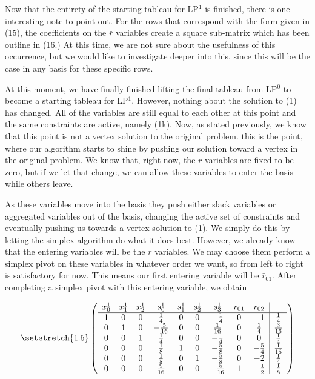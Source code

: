 \documentclass[11pt]{article} %
\begin{document}
	Now that the entirety of the starting tableau for LP$^1$ is finished, there is one interesting note to point out.  For the rows that correspond with the form given in (15), the coefficients on the $\bar{r}$ variables create a square sub-matrix which has been outline in (16.)  At this time, we are not sure about the usefulness of this occurrence, but we would like to investigate deeper into this, since this will be the case in any basis for these specific rows. 
	
	At this moment, we have finally finished lifting the final tableau from LP$^0$ to become a starting tableau for LP$^1$.  However, nothing about the solution to (1) has changed.  All of the variables are still equal to each other at this point and the same constraints are active, namely (1k).  Now, as stated previously, we know that this point is not a vertex solution to the original problem.  this is the point, where our algorithm starts to shine by pushing our solution toward a vertex in the original problem.  We know that, right now, the $\bar{r}$ variables are fixed to be zero, but if we let that change, we can allow these variables to enter the basis while others leave.
	
	As these variables move into the basis they push either slack variables or aggregated variables out of the basis, changing the active set of constraints and eventually pushing us towards a vertex solution to (1).  We simply do this by letting the simplex algorithm do what it does best.  However, we already know that the entering variables will be the $\bar{r}$ variables.  We may choose them perform a simplex pivot on these variables in whatever order we want, so from left to right is satisfactory for now.  This means our first entering variable will be $\bar{r}_{01}$.  After completing a simplex pivot with this entering variable, we obtain 
	
	\begin{equation}\setstretch{1.5}
	\begin{pmatrix}
	\begin{array}{ccccccccc|c}
	\bar{x}^1_0 & \bar{x}^1_1 & \bar{x}^1_2 & \bar{s}^1_0 & \bar{s}^1_1 & \bar{s}^1_2 & \bar{s}^1_3 & \bar{r}_{01} & \bar{r}_{02} \\
	\hline
	1 & 0 & 0 & \frac{1}{4} & 0 & 0 & -\frac{1}{4} & 0 & -1 & \frac{1}{4} \\ 
	0 & 1 & 0 & -\frac{5}{16} & 0 & 0 & \frac{1}{16} &  0 & \frac{1}{4} & \frac{3}{16} \\ 
	0 & 0 & 1 & \frac{1}{4} & 0 & 0 & -\frac{1}{4} & 0 & 0 & \frac{1}{4} \\ 
	0 & 0 & 0 & \frac{1}{8} & 1 & 0 & -\frac{5}{8} & 0 & -\frac{5}{4} & \frac{1}{16} \\ 
	0 & 0 & 0 & \frac{1}{8} & 0 & 1 & -\frac{5}{8} & 0 & -2 & \frac{1}{4} \\
	0 & 0 & 0 & \frac{9}{16} & 0 & 0 & -\frac{5}{16} & 1 & -\frac{1}{2} & \frac{1}{8} \\
	\end{array}
	\end{pmatrix}
	\end{equation}
	
\end{document}

